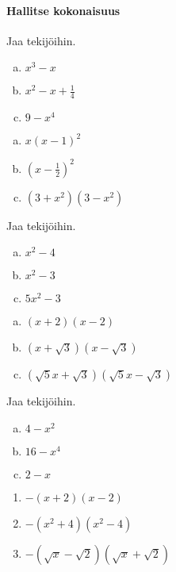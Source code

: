 \begin{tehtavasivu}
\paragraph*{Hallitse kokonaisuus}

\begin{tehtava}
    Jaa tekijöihin.
    \begin{enumerate}[a)]
    	\item $x^3 - x$
        \item $x^2 - x + \frac{1}{4} $
        \item $9-x^4$
    \end{enumerate}
    \begin{vastaus}
        \begin{enumerate}[a)]
            \item $x(x-1)^2$
            \item $(x-\frac{1}{2})^2$
            \item $(3+x^2)(3-x^2)$
        \end{enumerate}
    \end{vastaus}
\end{tehtava}

\begin{tehtava}
    Jaa tekijöihin.
    \begin{enumerate}[a)]
    	\item $x^2 -4$
    	\item $x^2 -3$
    	\item $5x^2 -3$
    \end{enumerate}
    \begin{vastaus}
        \begin{enumerate}[a)]
            \item $(x+2)(x-2)$
            \item $(x+\sqrt{3})(x-\sqrt{3})$
            \item $(\sqrt{5}x+\sqrt{3})(\sqrt{5}x-\sqrt{3})$
        \end{enumerate}
    \end{vastaus}
\end{tehtava}

\begin{tehtava}
	Jaa tekijöihin.
	\begin{enumerate}[a)]
		\item $4-x^2$
		\item $16-x^4$
		\item $2-x$
	\end{enumerate}
	\begin{vastaus}
		\begin{enumerate}
			\item $-(x+2)(x-2)$
			\item $-(x^2+4)(x^2-4)$
			\item $-(\sqrt{x}-\sqrt{2})(\sqrt{x}+\sqrt{2})$
		\end{enumerate}
	\end{vastaus}
\end{tehtava}


\end{tehtavasivu}
